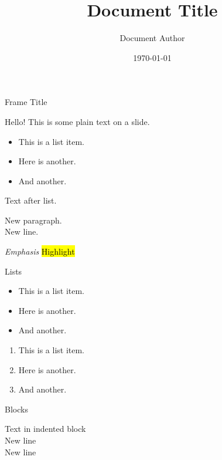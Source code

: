 \documentclass[11pt]{khslides}
\title{Document Title}
\author{Document Author}
\date{\today}
\begin{document}
\vspace*{\fill}
\maketitle
\vspace*{\fill}


\begin{slide}{Frame Title}

Hello! This is some plain text on a slide.

\begin{itemize}
\item This is a list item.
\item Here is another.
\item And another.
\end{itemize}

Text after list.

New paragraph.
\\ New line.

\emph{Emphasis} \quad {} \quad \hl{Highlight} \quad {}

 \quad {} \quad {} \quad {} \quad {}

\end{slide}


\begin{slide}{Lists}

\begin{itemize}
\item This is a list item.
\item Here is another.
\item And another.
\end{itemize}

\begin{enumerate}
\item This is a list item.
\item Here is another.
\item And another.
\end{enumerate}

\end{slide}


\begin{slide}{Blocks}

\begin{indentblock}
Text in indented block \\
New line \\
New line
\end{indentblock}

\end{slide}
\end{document}
